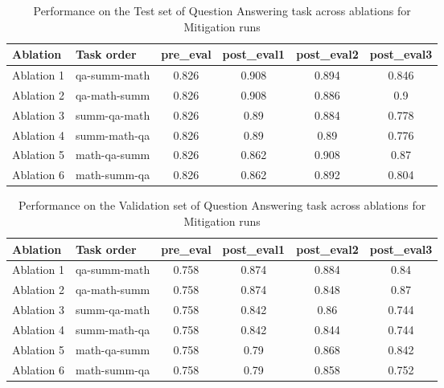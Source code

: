 \begin{table}[!ht]
    \centering
    \caption{Performance on the Test set of Question Answering task across ablations for Mitigation runs}
    \begin{tabular}{|l|l|S[table-format=2.4]|S[table-format=2.4]|S[table-format=2.4]|S[table-format=2.4]|}
    \hline
        \textbf{Ablation} & \textbf{Task order} & \textbf{pre\_eval} & \textbf{post\_eval1} & \textbf{post\_eval2} & \textbf{post\_eval3 } \\ \hline
        Ablation 1 & qa-summ-math & 0.826 & 0.908 & 0.894 & 0.846  \\ 
        Ablation 2 & qa-math-summ & 0.826 & 0.908 & 0.886 & 0.9  \\ 
        Ablation 3 & summ-qa-math & 0.826 & 0.89 & 0.884 & 0.778  \\ 
        Ablation 4 & summ-math-qa & 0.826 & 0.89 & 0.89 & 0.776  \\ 
        Ablation 5 & math-qa-summ & 0.826 & 0.862 & 0.908 & 0.87  \\ 
        Ablation 6 & math-summ-qa & 0.826 & 0.862 & 0.892 & 0.804  \\ \hline
    \end{tabular}
    \label{tab:QATestMitigation}
\end{table}

\begin{table}[!ht]
    \centering
    \caption{Performance on the Validation set of Question Answering task across ablations for Mitigation runs}
    \begin{tabular}{|l|l|S[table-format=2.4]|S[table-format=2.4]|S[table-format=2.4]|S[table-format=2.4]|}
    \hline
        \textbf{Ablation} & \textbf{Task order} & \textbf{pre\_eval} & \textbf{post\_eval1} & \textbf{post\_eval2} & \textbf{post\_eval3 } \\ \hline
        Ablation 1 & qa-summ-math & 0.758 & 0.874 & 0.884 & 0.84  \\ 
        Ablation 2 & qa-math-summ & 0.758 & 0.874 & 0.848 & 0.87  \\ 
        Ablation 3 & summ-qa-math & 0.758 & 0.842 & 0.86 & 0.744  \\ 
        Ablation 4 & summ-math-qa & 0.758 & 0.842 & 0.844 & 0.744  \\ 
        Ablation 5 & math-qa-summ & 0.758 & 0.79 & 0.868 & 0.842  \\ 
        Ablation 6 & math-summ-qa & 0.758 & 0.79 & 0.858 & 0.752  \\ \hline
    \end{tabular}
    \label{tab:QAValMitigation}
\end{table}

